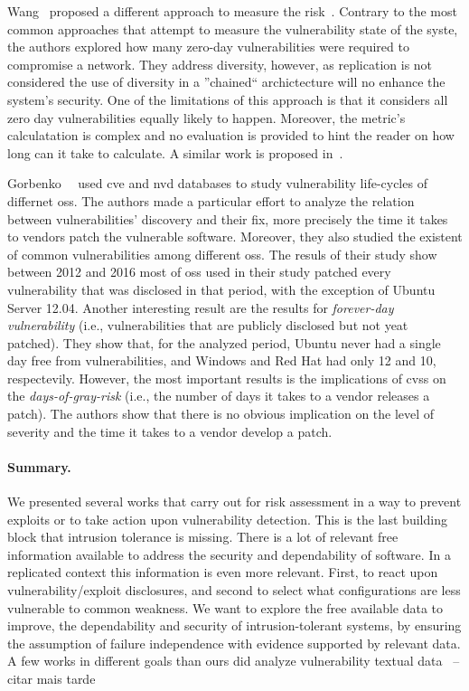 Wang~\etal{} proposed a different approach to measure the risk~\cite{Wang:2014}. 
Contrary to the most common approaches that attempt to measure the vulnerability state of the syste, the authors explored how many zero-day vulnerabilities were required to compromise a network. 
They address diversity, however, as replication is not considered the use of diversity in a ''chained`` archictecture will no enhance the system's security.
One of the limitations of this approach is that it considers all zero day vulnerabilities equally likely to happen.
Moreover, the metric's calculatation is complex and no evaluation is provided to hint the reader on how long can it take to calculate.
A similar work is proposed in~\cite{Bopche:2015}.



Gorbenko~\etal{}~\cite{Gorbenko:2017} used \gls{cve} and \gls{nvd} databases to study vulnerability life-cycles of differnet \glspl{os}.
The authors made a particular effort to analyze the relation between vulnerabilities' discovery and their fix, more precisely the time it takes to vendors patch the vulnerable software.
Moreover, they also studied the existent of common vulnerabilities among different \glspl{os}.
The resuls of their study show between 2012 and 2016 most of \glspl{os} used in their study patched every vulnerability that was disclosed in that period, with the exception of Ubuntu Server 12.04.
Another interesting result are the results for \emph{forever-day vulnerability} (i.e., vulnerabilities that are publicly disclosed but not yeat patched). 
They show that, for the analyzed period, Ubuntu never had a single day free from vulnerabilities, and Windows and Red Hat had  only 12 and 10, respectevily.
However, the most important results is the implications of \gls{cvss} on the \emph{days-of-gray-risk} (i.e., the number of days it takes to a vendor releases a patch). 
The authors show that there is no obvious implication on the level of severity and the time it takes to a vendor develop a patch.


\paragraph{Summary.} We presented several works that carry out for risk assessment in a way to prevent exploits or to take action upon vulnerability detection. 
This is the last building block that intrusion tolerance is missing. 
There is a lot of relevant free information available to address the security and dependability of software. 
In a replicated context this information is even more relevant. 
First, to react upon vulnerability/exploit disclosures, and second to select what configurations are less vulnerable to common weakness. 
We want to explore the free available data to improve, the dependability and security of intrusion-tolerant systems, by ensuring the assumption of failure independence with evidence supported by  relevant data.
A few works in different goals than ours did analyze vulnerability textual data~\cite{Joshi:2013} -- citar mais tarde



